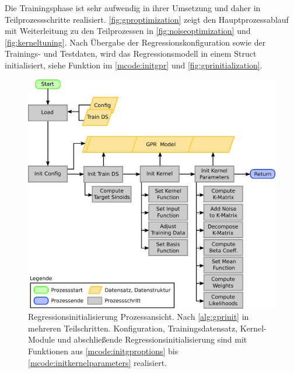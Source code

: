 \clearpage


Die Trainingsphase ist sehr aufwendig in ihrer Umsetzung und daher in Teilprozessschritte realisiert. \autoref{fig:gproptimization} zeigt den Hauptprozessablauf mit Weiterleitung zu den Teilprozessen in \autoref{fig:noiseoptimization} und \autoref{fig:kerneltuning}. Nach Übergabe der Regressionskonfiguration sowie der Trainings- und Testdaten, wird das Regressionsmodell in einem Struct initialisiert, siehe Funktion im \autoref{mcode:initgpr} und \autoref{fig:gprinitialization}.

\vspace{5mm}
\begin{figure}[bph]
	\centering
	\includegraphics[width=\linewidth]{chapters/images/3-SW-E-OExp/GPR_Initialization}
	\caption[Regressionsinitialisierung Prozessansicht]{Regressionsinitialisierung Prozessansicht. Nach \autoref{alg:gprinit} in mehreren Teilschritten. Konfiguration, Trainingsdatensatz, Kernel-Module und abschließende Regressionsinitialisierung sind mit Funktionen aus \autoref{mcode:initgproptions} bis \autoref{mcode:initkernelparameters} realisiert.}
	\label{fig:gprinitialization}
\end{figure}


\clearpage


